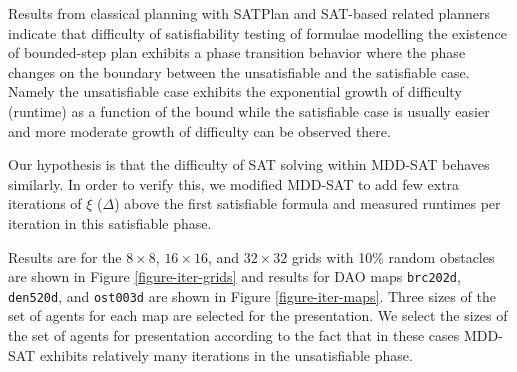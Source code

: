 \documentclass[jair,oneside,11pt]{article}
\begin{document}
Results from classical planning with SATPlan and SAT-based related planners \cite{DBLP:conf/ecai/KautzS92,DBLP:conf/kr/KautzMS96,DBLP:conf/aaai/Kautz06,DBLP:conf/ecai/Rintanen12a} indicate that difficulty of satisfiability testing of formulae modelling the existence of bounded-step plan exhibits a phase transition behavior where the phase changes on the boundary between the unsatisfiable and the satisfiable case. Namely the unsatisfiable case exhibits the exponential growth of difficulty (runtime) as a function of the bound while the satisfiable case is usually easier and more moderate growth of difficulty can be observed there.

Our hypothesis is that the difficulty of SAT solving within MDD-SAT behaves similarly. In order to verify this, we modified MDD-SAT to add few extra iterations of $\xi$ ($\Delta$) above the first satisfiable formula and measured runtimes per iteration in this satisfiable phase.

Results are for the $8{}\times{}8$, $16{}\times{}16$, and $32{}\times{}32$ grids with 10\% random obstacles are shown in Figure \ref{figure-iter-grids} and results for DAO maps \texttt{brc202d},  \texttt{den520d}, and \texttt{ost003d} are shown in Figure \ref{figure-iter-maps}. Three sizes of the set of agents for each map are selected for the presentation. We select the sizes of the set of agents for presentation according to the fact that in these cases MDD-SAT exhibits relatively many iterations in the unsatisfiable phase.
\end{document}
